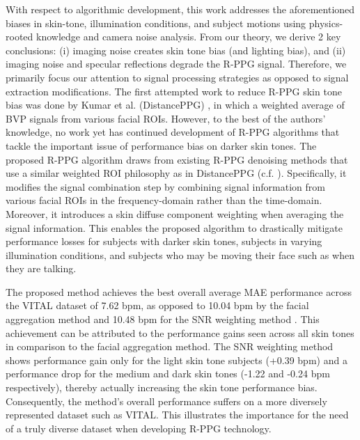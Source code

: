 With respect to algorithmic development, this work addresses the aforementioned biases in skin-tone, illumination conditions, and subject motions using physics-rooted knowledge and camera noise analysis. From our theory, we derive 2 key conclusions: (i) imaging noise creates skin tone bias (and lighting bias), and (ii) imaging noise and specular reflections degrade the R-PPG signal. Therefore, we primarily focus our attention to signal processing strategies as opposed to signal extraction modifications. The first attempted work to reduce R-PPG skin tone bias was done by Kumar et al. (DistancePPG) \cite{kumar_distanceppg_2015}, in which a weighted average of BVP signals from various facial ROIs. However, to the best of the authors’ knowledge, no work yet has continued development of R-PPG algorithms that tackle the important issue of performance bias on darker skin tones. The proposed R-PPG algorithm draws from existing R-PPG denoising methods that use a similar weighted ROI philosophy as in DistancePPG (c.f. \cite{po_block-based_2018,li_model-based_2020,bobbia_unsupervised_2019}). Specifically, it modifies the signal combination step by combining signal information from various facial ROIs in the frequency-domain rather than the time-domain. Moreover, it introduces a skin diffuse component weighting when averaging the signal information. This enables the proposed algorithm to drastically mitigate performance losses for subjects with darker skin tones, subjects in varying illumination conditions, and subjects who may be moving their face such as when they are talking. 

The proposed method achieves the best overall average MAE performance across the VITAL dataset of 7.62 bpm, as opposed to 10.04 bpm by the facial aggregation method \cite{poh_noncontact_2010,haan_robust_2013,wang_novel_2016,wang_algorithmic_2017,lewandowska_measuring_2011,de_haan_improved_2014} and 10.48 bpm for the SNR weighting method \cite{po_block-based_2018,li_model-based_2020,kumar_distanceppg_2015,bobbia_unsupervised_2019}. This achievement can be attributed to the performance gains seen across all skin tones in comparison to the facial aggregation method. The SNR weighting method shows performance gain only for the light skin tone subjects (+0.39 bpm) and a performance drop for the medium and dark skin tones (-1.22 and -0.24 bpm respectively), thereby actually increasing the skin tone performance bias. Consequently, the method’s overall performance suffers on a more diversely represented dataset such as VITAL. This illustrates the importance for the need of a truly diverse dataset when developing R-PPG technology.


